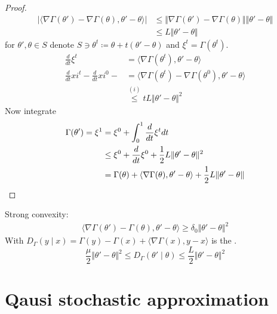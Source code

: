 \begin{proof}
    \begin{align*}
        \vert\langle \nabla\Gamma(\theta')-\nabla\Gamma(\theta),\theta'-\theta\rangle\vert & \leq \Vert \nabla\Gamma(\theta')-\nabla\Gamma(\theta)\Vert \Vert \theta'-\theta\Vert\\
        &\leq L \Vert \theta'-\theta\Vert
    \end{align*}
     for \(\theta',\theta\in S\) denote \(S\ni\theta^t\coloneqq\theta+t(\theta'-\theta)\)
    and \(\xi^t=\Gamma(\theta^t)\).
    \begin{align*}
        \frac{d}{dt}\xi^t&=\langle\nabla\Gamma(\theta^t),\theta'-\theta \rangle\\
        \frac{d}{dt}xi^t-\frac{d}{dt}xi^0-&=\langle\nabla\Gamma(\theta^t)-\nabla\Gamma(\theta^0),\theta'-\theta \rangle\\
        &\stackrel{(i)}{\leq} tL \Vert \theta'-\theta\Vert^2
    \end{align*} 
    Now integrate 
    \begin{align*}
        \Gamma(\theta')=\xi^1&=\xi^0+\int_0^1\frac{d}{dt}\xi^t dt \\
        &\leq \xi^0+\frac{d}{dt}\xi^0+\frac{1}{2}L\Vert \theta'-\theta\Vert^2 \\
        &=\Gamma(\theta)+\langle \nabla\Gamma(\theta),\theta'-\theta\rangle+\frac{1}{2}L\Vert \theta'-\theta\Vert\qedhere
    \end{align*}
\end{proof}

\begin{remark}
    Strong convexity: 
    \begin{align*}
        \langle\nabla\Gamma(\theta')-\Gamma(\theta),\theta'-\theta\rangle\geq \delta_0\Vert \theta'-\theta\Vert^2
    \end{align*}
    With \(D_\Gamma(y\mid x)=\Gamma(y)-\Gamma(x)+\langle \nabla\Gamma(x),y-x\rangle\)
    is the .
    \[\frac{\mu}{2}\Vert \theta'-\theta\Vert^2\leq D_\Gamma(\theta'\mid\theta)\leq \frac{L}{2}\Vert \theta'-\theta\Vert^2\]
\end{remark}

\section{Qausi stochastic approximation}%

